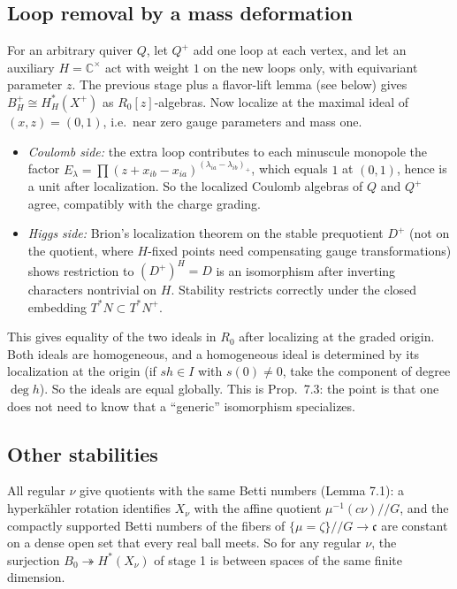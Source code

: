 \documentclass[11pt]{amsart}
\theoremstyle{remark}
\newcommand{\C}{\mathbb{C}}
\begin{document}
\subsection{Loop removal by a mass deformation}
For an arbitrary quiver $Q$, let $Q^+$ add one loop at each vertex, and let
an auxiliary $H=\C^\times$ act with weight $1$ on the new loops only, with
equivariant parameter $z$.  The previous stage plus a flavor-lift lemma
(see below) gives $B^+_H\cong H^*_H(X^+)$ as $R_0[z]$-algebras.  Now localize
at the maximal ideal of $(x,z)=(0,1)$, i.e.\ near zero gauge parameters and
mass one.
\begin{itemize}[leftmargin=2em]
\item \emph{Coulomb side:} the extra loop contributes to each minuscule
monopole the factor $E_\lambda=\prod(z+x_{ib}-x_{ia})^{(\lambda_{ia}-\lambda_{ib})_+}$,
which equals $1$ at $(0,1)$, hence is a unit after localization.  So the
localized Coulomb algebras of $Q$ and $Q^+$ agree, compatibly with the
charge grading.
\item \emph{Higgs side:} Brion's localization theorem on the stable
prequotient $D^+$ (not on the quotient, where $H$-fixed points need
compensating gauge transformations) shows restriction to $(D^+)^H=D$ is an
isomorphism after inverting characters nontrivial on $H$.  Stability
restricts correctly under the closed embedding $T^*N\subset T^*N^+$.
\end{itemize}
This gives equality of the two ideals in $R_0$ after localizing at the
graded origin.  Both ideals are homogeneous, and a homogeneous ideal is
determined by its localization at the origin (if $sh\in I$ with
$s(0)\neq0$, take the component of degree $\deg h$).  So the ideals are
equal globally.  This is Prop.~7.3: the point is that one does not need
to know that a ``generic'' isomorphism specializes.

\subsection{Other stabilities}  All regular $\nu$ give quotients with the
same Betti numbers (Lemma 7.1): a hyperk\"ahler rotation identifies
$X_\nu$ with the affine quotient $\mu^{-1}(c\nu)/\!/G$, and the compactly
supported Betti numbers of the fibers of $\{\mu=\zeta\}/\!/G\to\mathfrak c$
are constant on a dense open set that every real ball meets.  So for any
regular $\nu$, the surjection $B_0\twoheadrightarrow H^*(X_\nu)$ of stage 1
is between spaces of the same finite dimension.
\end{document}
